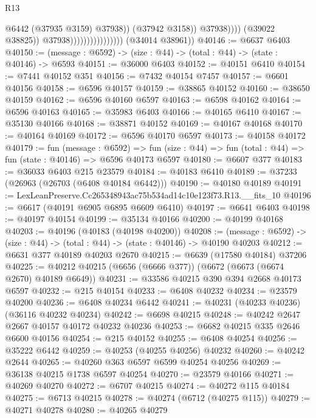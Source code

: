 \begin{lexlean}{R13}
\begin{coremodule}
                                                      @6442
                                                      (@37935 @3159)
                                                      @37938))
                                                  (@37942 @3158))
                                                @37938))))
                                        (@39022 @38825))
                                      @37938))))))))))))))))
      (@34014 @38961))
@40146 := @6637 @6403
@40150 := (message : @6592) -> (size : @44) -> (total : @44) -> (state : @40146) -> @6593
@40151 := @36000 @6403
@40152 := @40151 @6410
@40154 := @7441 @40152 @351
@40156 := @7432 @40154 @7457
@40157 := @6601 @40156
@40158 := @6596 @40157
@40159 := @38865 @40152
@40160 := @38650 @40159
@40162 := @6596 @40160 @6597
@40163 := @6598 @40162
@40164 := @6596 @40163
@40165 := @35983 @6403
@40166 := @40165 @6410
@40167 := @35130 @40166
@40168 := @38871 @40152
@40169 := @40167 @40168
@40170 := @40164 @40169
@40172 := @6596 @40170 @6597
@40173 := @40158 @40172
@40179 := fun (message : @6592) =>
  fun (size : @44) => fun (total : @44) => fun (state : @40146) => @6596 @40173 @6597
@40180 := @6607 @377
@40183 := @36033 @6403 @215 @23579
@40184 := @40183 @6410
@40189 := @37233 (@26963 (@26703 (@6408 @40184 @6442)))
@40190 := @40180 @40189
@40191 := LexLeanPreserve.Cc265348943ac75b534ad14c10e123f73.R13.__fits_10
@40196 := @6617 (@40191 @6905 @6895 @6609 @6410)
@40197 := @6641 @6403
@40198 := @40197 @40154
@40199 := @35134 @40166
@40200 := @40199 @40168
@40203 := @40196 (@40183 (@40198 @40200))
@40208 := (message : @6592) -> (size : @44) -> (total : @44) -> (state : @40146) -> @40190 @40203
@40212 := @6631 @377 @40189 @40203 @2670
@40215 := @6639 (@17580 @40184) @37206
@40225 := @40212 @40215 (@6656 (@6666 @377)) (@6672 (@6673 (@6674 @2670) @40189 @6649))
@40231 := @33586 @40215 @390 @394 @2668 @40173 @6597
@40232 := @215 @40154
@40233 := @6408 @40232
@40234 := @23579 @40200
@40236 := @6408 @40234 @6442
@40241 := @40231 (@40233 @40236) (@36116 @40232 @40234)
@40242 := @6698 @40215
@40248 := @40242 @2647 @2667 @40157 @40172 @40232 @40236
@40253 := @6682 @40215 @335 @2646 @6600 @40156
@40254 := @215 @40152
@40255 := @6408 @40254
@40256 := @35222 @6442
@40259 := @40253 (@40255 @40256) @40232
@40260 := @40242 @2644
@40265 := @40260 @363 @6597 @6599 @40254 @40256
@40269 := @36138 @40215 @1738 @6597 @40254
@40270 := @23579 @40166
@40271 := @40269 @40270
@40272 := @6707 @40215
@40274 := @40272 @115 @40184
@40275 := @6713 @40215
@40278 := @40274 (@6712 (@40275 @115))
@40279 := @40271 @40278
@40280 := @40265 @40279

\end{coremodule}
\end{lexlean}
